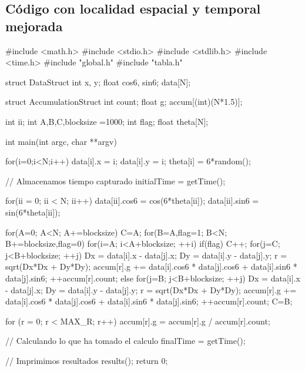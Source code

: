 \subsection{C\'odigo con localidad espacial y temporal mejorada}
\begin{verbatimtab}
#include <math.h>
#include <stdio.h>
#include <stdlib.h>
#include <time.h>
#include "global.h"
#include "tabla.h"

struct DataStruct
{
	int x, y;
	float cos6, sin6;
} data[N];

struct AccumulationStruct
{
	int count;
	float g;
} accum[(int)(N*1.5)];

int ii;
int A,B,C,blocksize =1000;
int flag;
float theta[N];

int main(int argc, char **argv)
{
	for(i=0;i<N;i++)
	{
		data[i].x = i;
		data[i].y = i;
		theta[i] = 6*random();
	}

	//	Almacenamos tiempo capturado
	initialTime = getTime();

	for(ii = 0; ii < N; ii++)
	{
		data[ii].cos6 = cos(6*theta[ii]);
		data[ii].sin6 = sin(6*theta[ii]);
	}

	for(A=0; A<N; A+=blocksize)
	{
		C=A;
		for(B=A,flag=1; B<N; B+=blocksize,flag=0)
		{
			for(i=A; i<A+blocksize; ++i)
			{	
				if(flag)
				{
					C++;
					for(j=C; j<B+blocksize; ++j)
					{
						Dx = data[i].x - data[j].x;
						Dy = data[i].y - data[j].y;
						r = sqrt(Dx*Dx + Dy*Dy);
						accum[r].g += data[i].cos6 * data[j].cos6 + data[i].sin6 * data[j].sin6;
						++accum[r].count;
					}
				}
				else
					for(j=B; j<B+blocksize; ++j)
					{
						Dx = data[i].x - data[j].x;
						Dy = data[i].y - data[j].y;
						r = sqrt(Dx*Dx + Dy*Dy);
						accum[r].g += data[i].cos6 * data[j].cos6 + data[i].sin6 * data[j].sin6;
						++accum[r].count;
					}
			}
			C=B;
		}
	}

	for (r = 0; r < MAX_R; r++)
		accum[r].g = accum[r].g / accum[r].count;

	//	Calculando lo que ha tomado el calculo
	finalTime = getTime();
	
	//	Imprimimos resultados
	results();
	return 0;

}
\end{verbatimtab}
